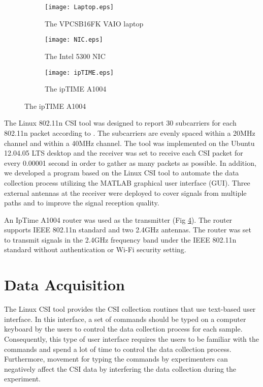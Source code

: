 \begin{figure}
	\centering
	\begin{subfigure}[t]{.6\linewidth}
		\centering
		\texttt{[image: Laptop.eps]}
		\caption{The VPCSB16FK VAIO laptop}\label{fig:Devices_Laptop}
	\end{subfigure} %
	\hfill
	\begin{subfigure}[t]{.37\linewidth}
		\centering
		\texttt{[image: NIC.eps]}
		\caption{The Intel 5300 NIC}\label{fig:Devices_NIC}
	\end{subfigure} %
	
	\begin{subfigure}[t]{.3\linewidth}
		\centering
		\texttt{[image: ipTIME.eps]}
		\caption{The ipTIME A1004}\label{fig:Devices_ipTIME}
	\end{subfigure}
	
	
\end{figure}

The Linux 802.11n CSI tool was designed to report 30 subcarriers for each 802.11n packet according to \cite{Halperin2011}.  The subcarriers are evenly spaced within a 20MHz channel and within a 40MHz channel. The tool was implemented on the Ubuntu 12.04.05 LTS desktop and the receiver was set to receive each CSI packet for every 0.00001 second in order to gather as many packets as possible. In addition, we developed a program based on the Linux CSI tool to automate the data collection process utilizing the MATLAB graphical user interface (GUI). Three external antennas at the receiver were deployed to cover signals from multiple paths and to improve the signal reception quality.

An IpTime A1004 router was used as the transmitter (Fig \ref{fig:Devices_ipTIME}). The router supports IEEE 802.11n standard and two 2.4GHz antennas. The router was set to transmit signals in the 2.4GHz frequency band under the IEEE 802.11n standard without authentication or Wi-Fi security setting.

\section{Data Acquisition}
\label{sec:data_acquisition}
The Linux CSI tool provides the CSI collection routines that use text-based user interface. In this interface, a set of commands should be typed on a computer keyboard by the users to control the data collection process for each sample. Consequently, this type of user interface requires the users to be familiar with the commands and spend a lot of time to control the data collection process. Furthermore, movement for typing the commands by experimenters can negatively affect the CSI data by interfering the data collection during the experiment.

